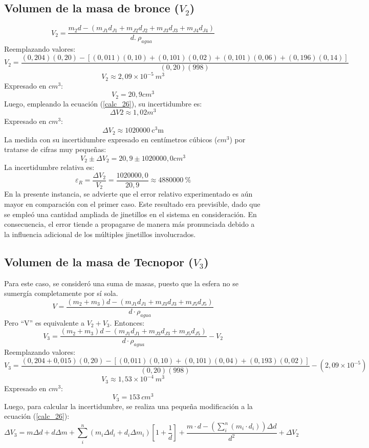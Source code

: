 \documentclass[../main.tex]{subfiles}
\begin{document}
\subsection{Volumen de la masa de bronce ($V_2$)}
\[V_2=\frac{m_2d-\left(m_{J1}d_{J1}+m_{J2}d_{J2}+m_{J3}d_{J3}+m_{J4}d_{J4}\right)}{d.\ \rho_{agua}}\]
Reemplazando valores:
\[V_2=\frac{\left(0,204\right)\left(0,20\right)-\left[\left(0,011\right)\left(0,10\right)+\left(0,101\right)\left(0,02\right)+\left(0,101\right)\left(0,06\right)+\left(0,196\right)\left(0,14\right)\right]}{\left(0,20\right)\left(998\right)}\]
\[V_2\approx2,09\times{10}^{-5}\ m^3\]
Expresado en $cm^3$:
\[V_2=20,9 cm^3\]
Luego, empleando la ecuación (\ref{calc_26}), su incertidumbre es:
\[\Delta V2\approx1,02 m^3\]
Expresado en $cm^3$:
\[\Delta V_2 \approx \qty{1020000}{\cubic\centi\metre}\]
La medida con su incertidumbre expresado en centímetros cúbicos ($cm^3$) por tratarse de cifras muy pequeñas:
\[V_2\pm\Delta V_2=20,9\pm 1020000,0 cm^3\]
La incertidumbre relativa es:
\[\varepsilon_R = \frac{\Delta V_2}{V_2} = \frac{1020000,0}{20,9} \approx \qty{4880000}{\percent}\]
En la presente instancia, se advierte que el error relativo experimentado es aún mayor
en comparación con el primer caso. Este resultado era previsible, dado que se empleó una 
cantidad ampliada de jinetillos en el sistema en consideración. En consecuencia, el error 
tiende a propagarse de manera más pronunciada debido a la influencia adicional 
de los múltiples jinetillos involucrados.

\subsection{Volumen de la masa de Tecnopor ($V_3$)}

Para este caso, se consideró una suma de masas, puesto que la esfera no se sumergía completamente por sí sola.
\[V=\frac{\left(m_2+m_3\right)d-\left(m_{J1}d_{J1}+m_{J3}d_{J3}+m_{J5}d_{J5}\right)}{d\cdot\rho_{agua}}\]
Pero “V” es equivalente a $V_2+V_3$. Entonces:
\[V_3=\frac{\left(m_2+m_3\right)d-\left(m_{J1}d_{J1}+m_{J3}d_{J3}+m_{J5}d_{J5}\right)}{d\cdot\rho_{agua}}-V_2\]
Reemplazando valores:
\[V_3=\frac{\left(0,204+0,015\right)\left(0,20\right)-\left[\left(0,011\right)\left(0,10\right)+\left(0,101\right)\left(0,04\right)+\left(0,193\right)\left(0,02\right)\right]}{\left(0,20\right)\left(998\right)}-\left(2,09\times{10}^{-5}\right)\]
\[V_3\approx1,53\times{10}^{-4}\ m^3\]
Expresado en $cm^3$:
\[V_3=153{\ cm}^3\]
Luego, para calcular la incertidumbre, se realiza una pequeña modificación a la ecuación (\ref{calc_26}):
\begin{equation} \label{calc_27}
    \Delta V_3=m\Delta d+d\Delta m + \sum_i^n(m_i\Delta d_i+d_i\Delta m_i)\left[1+\frac{1}{d}\right]+\frac{m\cdot d- (\sum_i^n(m_i\cdot d_i)) \Delta d}{d^2}+\Delta V_2
\end{equation}
\end{document}
